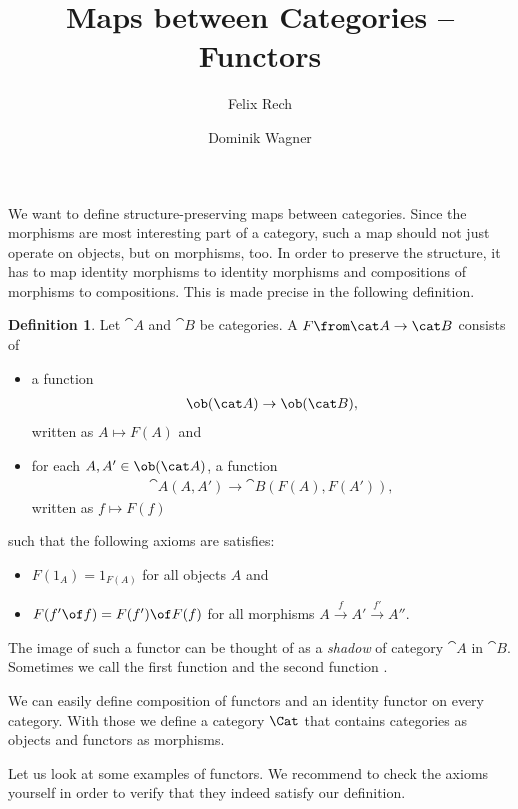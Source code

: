 \documentclass{article}
\theoremstyle{definition}
\newtheorem{definition}{Definition}
\begin{document}
\title{Maps between Categories -- Functors}
\author{Felix Rech \and Dominik Wagner}
\maketitle

We want to define structure-preserving maps between categories.
Since the morphisms are most interesting part of a category, such a map should not just operate on objects, but on morphisms, too.
In order to preserve the structure, it has to map identity morphisms to identity morphisms and compositions of morphisms to compositions.
This is made precise in the following definition.

\begin{definition}
  Let $\cat A$ and $\cat B$ be categories. A  $F \from \cat A\to\cat B$ consists of
    \begin{itemize}
    \item a function
      \begin{align*}
        \ob(\cat A)\to\ob(\cat B),
      \end{align*}
      written as $A\mapsto F(A)$ and
    \item for each $A,A'\in\ob(\cat A)$, a function
      \begin{align*}
        \cat A(A,A')\to\cat B(F(A),F(A')),
      \end{align*}
      written as $f\mapsto F(f)$
    \end{itemize}
    such that the following axioms are satisfies:
    \begin{itemize}
    \item $F(1_A)=1_{F(A)}$ for all objects $A$ and
    \item $F(f'\of f)=F(f')\of F(f)$ for all morphisms $A\xrightarrow{f}A'\xrightarrow{f'}A''$.
    \end{itemize}
\end{definition}

The image of such a functor can be thought of as a \textit{shadow} of category $\cat{A}$ in $\cat{B}$.
Sometimes we call the first function  and the second function .

We can easily define composition of functors and an identity functor on every category.
With those we define a category $\Cat$ that contains categories as objects and functors as morphisms.

Let us look at some examples of functors.
We recommend to check the axioms yourself in order to verify that they indeed satisfy our definition.
\end{document}
